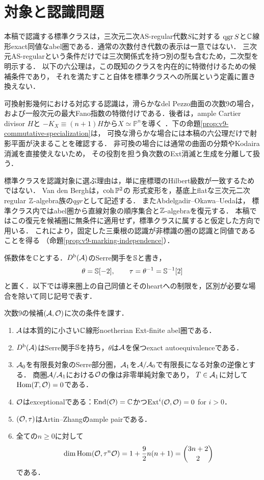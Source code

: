 \documentclass[11pt,a4paper]{ltjsarticle}
\begin{document}
\section{対象と認識問題}\label{sec:axioms}
本稿で認識する標準クラスは，三次元二次AS-regular代数$S$に対する
$\operatorname{qgr} S$と$\mathbb C$線形exact同値なabel圏である．通常の次数付き代数の表示は一意ではない．
三次元AS-regularという条件だけでは三次関係式を持つ別の型も含むため，二次型を明示する．
以下の六公理は，この既知のクラスを内在的に特徴付けるための候補条件であり，
それを満たすこと自体を標準クラスへの所属という定義に置き換えない．

可換射影幾何における対応する認識は，滑らかなdel Pezzo曲面の次数9の場合，
および一般次元の最大Fano指数の特徴付けである．後者は，ample Cartier divisor $H$と
$-K_X\equiv(n+1)H$から$X\simeq\mathbb P^n$を導く
\cite[Corollary 2(1)]{KachiKollar}．下の命題\ref{prop:v9-commutative-specialization}は，
可換な滑らかな場合には本稿の六公理だけで射影平面が決まることを確認する．
非可換の場合には通常の曲面の分類やKodaira消滅を直接使えないため，
その役割を担う負次数のExt消滅と生成を分離して扱う．

標準クラスを認識対象に選ぶ理由は，単に座標環のHilbert級数が一致するためではない．
Van den Bergh\cite[Definition 8.1, Theorem 8.1.1]{VdB}は，$\operatorname{coh}\mathbb P^2$の
形式変形を，基底上flatな三次元二次regular $\mathbb Z$-algebra族の$qgr$として記述する．
またAbdelgadir--Okawa--Ueda\cite[Theorem 7.3, Appendix A]{AOUCompact}は，
標準クラス内ではabel圏から直線対象の順序集合と$\mathbb Z$-algebraを復元する．
本稿ではこの復元を候補圏に無条件に適用せず，標準クラスに属すると仮定した方向で用いる．
これにより，固定した三乗根の認識が非標識の圏の認識と同値であることを得る
（命題\ref{prop:v9-marking-independence}）．

係数体を$\mathbb C$とする．$D^{\mathrm b}(\mathcal A)$のSerre関手を$\mathbb S$と書き，
\[
 \theta=\mathbb S[-2],\qquad \tau=\theta^{-1}=\mathbb S^{-1}[2]
\]
と置く．以下では導来圏上の自己同値とそのheartへの制限を，区別が必要な場合を除いて同じ記号で表す．

\begin{definition}[基礎公理]\label{def:axioms}
次数9の候補$(\mathcal A,\mathcal O)$に次の条件を課す．
\begin{enumerate}[label=(\arabic*)]
\item $\mathcal A$は本質的に小さい$\mathbb C$線形noetherian Ext-finite abel圏である．
\item $D^{\mathrm b}(\mathcal A)$はSerre関手$\mathbb S$を持ち，$\theta$は$\mathcal A$を保つexact autoequivalenceである．
\item $\mathcal A_0$を有限長対象のSerre部分圏，$\mathcal A_1$を$\mathcal A/\mathcal A_0$で有限長になる対象の逆像とする．
商圏$\mathcal A/\mathcal A_1$における$\mathcal O$の像は非零単純対象であり，
$T\in\mathcal A_1$に対して$\operatorname{Hom}(T,\mathcal O)=0$である．
\item $\mathcal O$はexceptionalである：$\operatorname{End}(\mathcal O)=\mathbb C$かつ$\operatorname{Ext}^i(\mathcal O,\mathcal O)=0$ for $i>0$．
\item $(\mathcal O,\tau)$はArtin--Zhangのample pairである．
\item 全ての$n\geq0$に対して
\begin{equation}\label{eq:anticanonical}
 \dim\operatorname{Hom}(\mathcal O,\tau^n\mathcal O)=1+\frac92n(n+1)
 =\binom{3n+2}{2}
\end{equation}
である．
\end{enumerate}
\end{definition}
\end{document}
